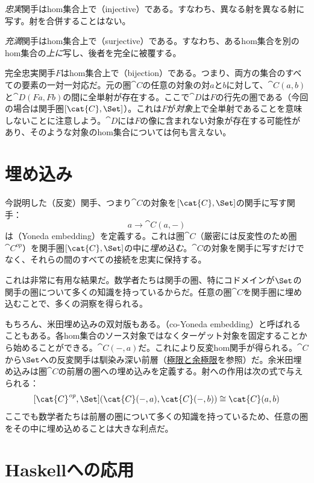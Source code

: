 \emph{忠実}関手はhom集合上で（injective）である。すなわち、異なる射を異なる射に写す。射を合併することはない。

\emph{充満}関手はhom集合上で（surjective）である。すなわち、あるhom集合を別のhom集合の\emph{上に}写し、後者を完全に被覆する。

完全忠実関手$F$はhom集合上で（bijection）である。つまり、両方の集合のすべての要素の一対一対応だ。元の圏$\cat{C}$の任意の対象の対$a$と$b$に対して、$\cat{C}(a, b)$と$\cat{D}(F a, F b)$の間に全単射が存在する。ここで$\cat{D}$は$F$の行先の圏である（今回の場合は関手圏$[\cat{C}, \Set]$）。これは$F$が\emph{対象}上で全単射であることを意味しないことに注意しよう。$\cat{D}$には$F$の像に含まれない対象が存在する可能性があり、そのような対象のhom集合については何も言えない。

\section{埋め込み}

今説明した（反変）関手、つまり$\cat{C}$の対象を$[\cat{C}, \Set]$の関手に写す関手：
\[a \to \cat{C}(a, -)\]
は（Yoneda embedding）を定義する。これは圏$\cat{C}$（厳密には反変性のため圏$\cat{C}^\mathit{op}$）を関手圏$[\cat{C}, \Set]$の中に\emph{埋め込む}。$\cat{C}$の対象を関手に写すだけでなく、それらの間のすべての接続を忠実に保持する。

これは非常に有用な結果だ。数学者たちは関手の圏、特にコドメインが$\Set$の関手の圏について多くの知識を持っているからだ。任意の圏$\cat{C}$を関手圏に埋め込むことで、多くの洞察を得られる。

もちろん、米田埋め込みの双対版もある。（co-Yoneda embedding）と呼ばれることもある。各hom集合のソース対象ではなくターゲット対象を固定することから始めることができる。$\cat{C}(-, a)$だ。これにより反変hom関手が得られる。$\cat{C}$から$\Set$への反変関手は馴染み深い前層（\hyperref[limits-and-colimits]{極限と余極限}を参照）だ。余米田埋め込みは圏$\cat{C}$の前層の圏への埋め込みを定義する。射への作用は次の式で与えられる：
\[[\cat{C}^\mathit{op}, \Set](\cat{C}(-, a), \cat{C}(-, b)) \cong \cat{C}(a, b)\]
ここでも数学者たちは前層の圏について多くの知識を持っているため、任意の圏をその中に埋め込めることは大きな利点だ。

\section{Haskellへの応用}

